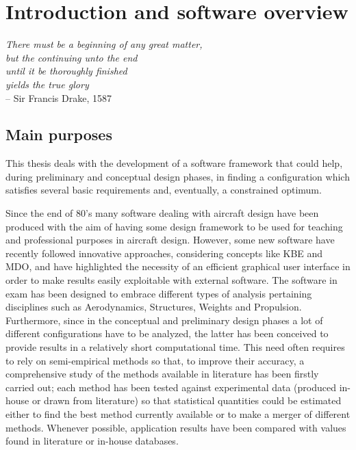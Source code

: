 \chapter{Introduction and software overview}

\begin{flushright}
	{\smaller
		\textit{There must be a beginning of any great matter,\\ but the continuing unto the end \\ until it be thoroughly finished \\ yields the true glory}\\
		-- Sir Francis Drake, 1587}
\end{flushright}

\section{Main purposes}
This thesis deals with the development of a software framework that could help, during preliminary and conceptual design phases, in finding a configuration which satisfies several basic requirements and, eventually, a constrained optimum. 

\bigskip
\noindent
Since the end of 80’s many software dealing with aircraft design have been produced with the aim of having some design framework to be used for teaching and professional purposes in aircraft design. However, some new software have recently followed innovative approaches, considering concepts like \gls{KBE} and \gls{MDO}, and have highlighted the necessity of an efficient graphical user interface in order to make results easily exploitable with external software.
%
The software in exam has been designed to embrace different types of analysis pertaining disciplines such as Aerodynamics, Structures, Weights and Propulsion. Furthermore, since in the conceptual and preliminary design phases a lot of different configurations have to be analyzed, the latter has been conceived to provide results in a relatively short computational time. This need often requires to rely on semi-empirical methods so that, to improve their accuracy, a comprehensive study of the methods available in literature has been firstly carried out; each method has been tested against experimental data (produced in-house or
drawn from literature) so that statistical quantities could be estimated either to find the best method currently available or to make a merger of different methods.
Whenever possible, application results have been compared with values found in literature or in-house databases.\cite{attanasio}

